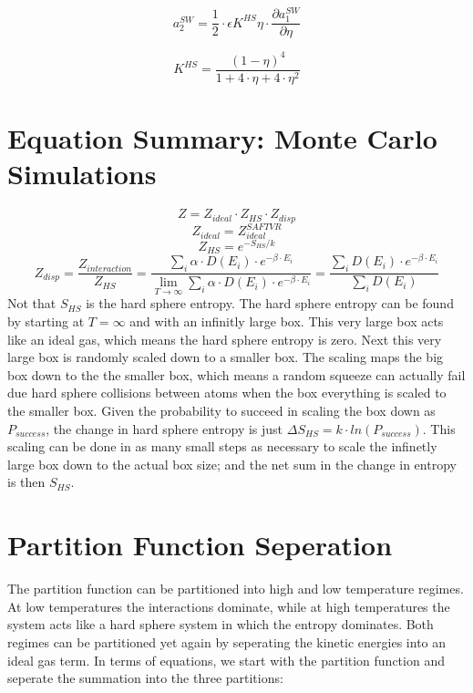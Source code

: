 \begin{multicols}{2}
\begin{equation}\label{eq:saft38}
a_2^{SW}=\frac{1}{2}\cdot \epsilon K^{HS}\eta\cdot \frac{\partial a_1^{SW}}{\partial \eta}
\end{equation}

\begin{equation}\label{eq:saft22}
K^{HS}=\frac{(1-\eta)^4}{1+4\cdot \eta+4\cdot \eta^2}
\end{equation}
\end{multicols}

\section{Equation Summary: Monte Carlo Simulations}
$$Z=Z_{ideal}\cdot Z_{HS}\cdot Z_{disp}$$
$$Z_{ideal}=Z_{ideal}^{SAFTVR}$$
$$Z_{HS}=e^{-S_{HS}/k}$$
$$Z_{disp}=\frac{Z_{interaction}}{Z_{HS}}=\frac{\sum_i \alpha\cdot D(E_i)\cdot e^{-\beta\cdot E_i}}{\lim_{T\to\infty}\sum_i \alpha\cdot D(E_i)\cdot e^{-\beta\cdot E_i}}=\frac{\sum_i D(E_i)\cdot e^{-\beta\cdot E_i}}{\sum_i D(E_i)}$$
Not that $S_{HS}$ is the hard sphere entropy. The hard sphere entropy can be found by starting at $T=\infty$ and with an infinitly large box. This very large box acts like an ideal gas, which means the hard sphere entropy is zero. Next this very large box is randomly scaled down to a smaller box. The scaling maps the big box down to the the smaller box, which means a random squeeze can actually fail due hard sphere collisions between atoms when the box everything is scaled to the smaller box. Given the probability to succeed in scaling the box down as $P_{success}$, the change in hard sphere entropy is just $\Delta S_{HS}=k\cdot ln(P_{success})$. This scaling can be done in as many small steps as necessary to scale the infinetly large box down to the actual box size; and the net sum in the change in entropy is then $S_{HS}$.

\section{Partition Function Seperation}
The partition function can be partitioned into high and low temperature regimes. At low temperatures the interactions dominate, while at high temperatures the system acts like a hard sphere system in which the entropy dominates. Both regimes can be partitioned yet again by seperating the kinetic energies into an ideal gas term. In terms of equations, we start with the partition function and seperate the summation into the three partitions:


